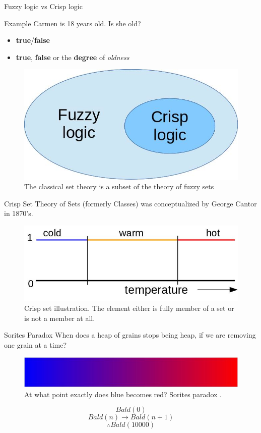 \documentclass[hyperref={unicode}]{beamer}
\begin{document}
\begin{frame}{Fuzzy logic vs Crisp logic}
	\begin{exampleblock}{Example}
	Carmen is 18 years old. Is she old?
	\end{exampleblock}

	\begin{itemize}
		\setlength{\itemindent}{2cm}
		\item[Crisp\footnote{In this context referred also as a \emph{Boolean} or \emph{bivalent} logic}] \textbf{true}/\textbf{false}
		\item[Fuzzy]  \textbf{true}, \textbf{false} or the \textbf{degree} of \textit{oldness}
	\end{itemize}

	\begin{figure}
	\includegraphics[width=.5\textwidth]{fuzzy-crisp}
	\caption{The classical set theory is a subset of the theory of fuzzy sets}
	\end{figure}
\end{frame}

\begin{frame}{Crisp Set}
	Theory of Sets (formerly Classes) was conceptualized by George Cantor in 1870's.
	\begin{figure}
	\includegraphics[width=.75\textwidth]{crisp-set}
	\caption{Crisp set illustration. The element either is fully member of a set or is not a member at all.}
	\end{figure}
\end{frame}

\begin{frame}{Sorites Paradox}
	When does a heap of grains stops being heap, if we are removing one grain at a time?

	\begin{figure}
	\includegraphics[width=.75\textwidth]{sorites-gradient}
	\caption{At what point exactly does blue becomes red? Sorites paradox \cite{podosky1985vagueness}.}
	\end{figure}

	$$Bald(0)$$
	$$Bald(n)\rightarrow Bald(n+1)$$
	$$\therefore Bald(10000)$$
\end{frame}
\end{document}

